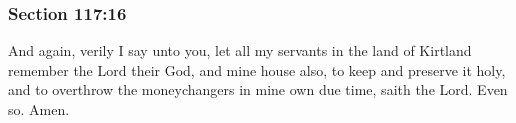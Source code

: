 	\subsubsection{Section 117:16} %
		\label{DC117-16}

		And again, verily I say unto you, let all my servants in the land of Kirtland remember the Lord their God, and mine house also, to keep and preserve it holy, and to overthrow the moneychangers in mine own due time, saith the Lord.  Even so.  Amen.

